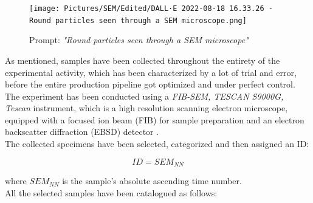 \documentclass{article}
\begin{document}
            \begin{figure}[h!]
                \centering
                \texttt{[image: Pictures/SEM/Edited/DALL·E 2022-08-18 16.33.26 - Round particles seen through a SEM microscope.png]}
                \caption{Prompt: \textit{"Round particles seen through a SEM microscope"}}
                \label{fig:SEM_DALLE2}
            \end{figure}

            \clearpage

            As mentioned, samples have been collected throughout the entirety of the experimental activity, which has been characterized by a lot of trial and error, 
            before the entire production pipeline got optimized and 
            under perfect control. \\ 

            The experiment has been conducted using a \textit{FIB-SEM, TESCAN S9000G, Tescan} instrument, which is a high resolution 
            scanning electron microscope, equipped with a focused ion beam (FIB) for sample preparation and 
            an electron backscatter diffraction (EBSD) detector \autocites{FIB-SEM_TESCAN_S9000G}. \\

            The collected specimens have been selected, categorized and then assigned an ID:

            \begin{equation}
                ID = SEM_{NN}
                \label{eq:SEM_ID}
            \end{equation}

            where $SEM_{NN}$ is the sample's absolute ascending time number. \\ 


            All the selected samples have been catalogued as follows:
\end{document}
